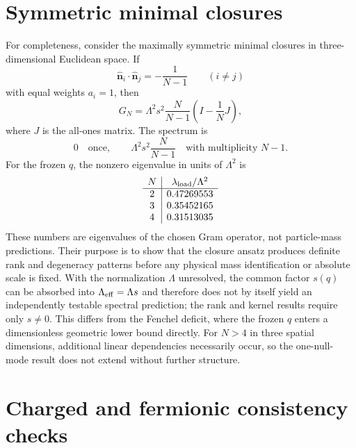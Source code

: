 \documentclass[10pt]{article}
\begin{document}
\section{Symmetric minimal closures}
\label{sec:symmetric}

For completeness, consider the maximally symmetric minimal closures in three-dimensional Euclidean space. If
\begin{equation}
\hat{\bm n}_i\cdot\hat{\bm n}_j
=-\frac{1}{N-1}
\qquad(i\neq j)
\label{eq:simplex}
\end{equation}
with equal weights $a_i=1$, then
\begin{equation}
G_N
=
\Lambda^2s^2\frac{N}{N-1}
\left(I-\frac{1}{N}J\right),
\label{eq:simplexG}
\end{equation}
where $J$ is the all-ones matrix. The spectrum is
\begin{equation}
\boxed{
0\quad\text{once},
\qquad
\Lambda^2s^2\frac{N}{N-1}
\quad\text{with multiplicity }N-1.
}
\label{eq:simplexSpec}
\end{equation}
For the frozen $q$, the nonzero eigenvalue in units of $\Lambda^2$ is
\begin{equation}
\begin{array}{c|c}
N&\lambda_{\rm load}/\Lambda^2\\
\hline
2&0.47269553\\
3&0.35452165\\
4&0.31513035
\end{array}
\label{eq:values}
\end{equation}
These numbers are eigenvalues of the chosen Gram operator, not particle-mass predictions. Their purpose is to show that the closure ansatz produces definite rank and degeneracy patterns before any physical mass identification or absolute scale is fixed. With the normalization $\Lambda$ unresolved, the common factor $s(q)$ can be absorbed into $\Lambda_{\rm eff}=\Lambda s$ and therefore does not by itself yield an independently testable spectral prediction; the rank and kernel results require only $s\neq0$. This differs from the Fenchel deficit, where the frozen $q$ enters a dimensionless geometric lower bound directly. For $N>4$ in three spatial dimensions, additional linear dependencies necessarily occur, so the one-null-mode result does not extend without further structure.

\section{Charged and fermionic consistency checks}
\label{sec:consistency}
\end{document}
